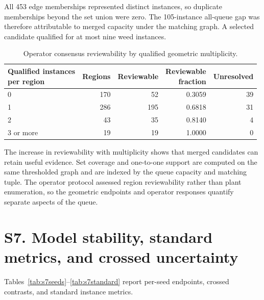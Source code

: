 \documentclass[preprint,12pt]{elsarticle}
\begin{document}
All 453 edge memberships represented distinct instances, so duplicate memberships beyond the set union were zero. The 105-instance all-queue gap was therefore attributable to merged capacity under the matching graph. A selected candidate qualified for at most nine weed instances.

\begin{table}[htbp]
\centering
\caption{Operator consensus reviewability by qualified geometric multiplicity.}
\label{tab:s6multiplicity}
\footnotesize
\setlength{\tabcolsep}{4pt}
\begin{tabular}{lrrrr}
\toprule
\shortstack{Qualified instances\\per region} & Regions & Reviewable & \shortstack{Reviewable\\fraction} & Unresolved \\
\midrule
0 & 170 & 52 & 0.3059 & 39 \\
1 & 286 & 195 & 0.6818 & 31 \\
2 & 43 & 35 & 0.8140 & 4 \\
3 or more & 19 & 19 & 1.0000 & 0 \\
\bottomrule
\end{tabular}
\end{table}

The increase in reviewability with multiplicity shows that merged candidates can retain useful evidence. Set coverage and one-to-one support are computed on the same thresholded graph and are indexed by the queue capacity and matching tuple. The operator protocol assessed region reviewability rather than plant enumeration, so the geometric endpoints and operator responses quantify separate aspects of the queue.

\section{S7. Model stability, standard metrics, and crossed uncertainty}

Tables~\ref{tab:s7seeds}--\ref{tab:s7standard} report per-seed endpoints, crossed contrasts, and standard instance metrics.
\end{document}
